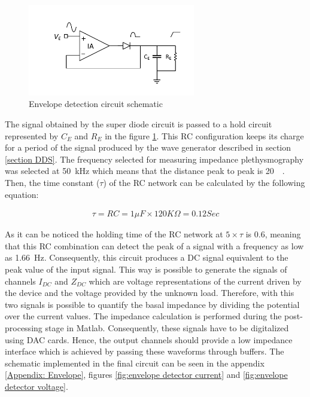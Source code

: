 \begin{figure}[!htpb]
	\centering
	\includegraphics[width=7.3cm,keepaspectratio]{figure5}
 	\caption{Envelope detection circuit schematic}
    \label{fig:envelope}
\end{figure}

The signal obtained by the super diode circuit is passed to a hold circuit represented by $C_E$ and $R_E$ in the figure \ref{fig:envelope}. This RC configuration keeps its charge for a period of the signal produced by the wave generator described in section \ref{section DDS}. The frequency selected for measuring impedance plethysmography was selected at \SI{50}{\kHz} which means that the distance peak to peak is \SI{20}{\micro\sec}. Then, the time constant ($\tau$) of the RC network can be calculated by the following equation:

\begin{align}
\tau = RC = 1 \mu F \times 120K\Omega = 0.12 Sec
\end{align}

As it can be noticed the holding time of the RC network at $5\times\tau$ is \SI{0.6}{\sec}, meaning that this RC combination can detect the peak of a signal with a frequency as low as \SI{1.66}{\hertz}. Consequently, this circuit produces a DC signal equivalent to the peak value of the input signal. This way is possible to generate the signals of channels $I_{DC}$ and $Z_{DC}$ which are voltage representations of the current driven by the device and the voltage provided by the unknown load. Therefore, with this two signals is possible to quantify the basal impedance by dividing the potential over the current values. The impedance calculation is performed during the post-processing stage in Matlab. Consequently, these signals have to be digitalized using DAC cards. Hence, the output channels should provide a low impedance interface which is achieved by passing these waveforms through buffers. The schematic implemented in the final circuit can be seen in the appendix \ref{Appendix: Envelope}, figures \ref{fig:envelope detector current} and \ref{fig:envelope detector voltage}.

